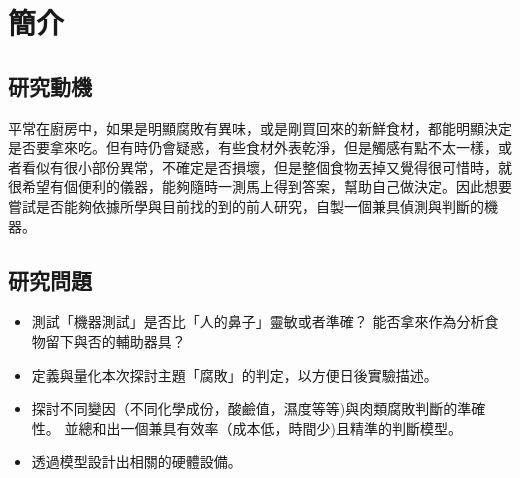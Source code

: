 \chapter{簡介}

\section{研究動機}
平常在廚房中，如果是明顯腐敗有異味，或是剛買回來的新鮮食材，都能明顯決定是否要拿來吃。但有時仍會疑惑，有些食材外表乾淨，但是觸感有點不太一樣，或者看似有很小部份異常，不確定是否損壞，但是整個食物丟掉又覺得很可惜時，就很希望有個便利的儀器，能夠隨時一測馬上得到答案，幫助自己做決定。因此想要嘗試是否能夠依據所學與目前找的到的前人研究，自製一個兼具偵測與判斷的機器。

\section{研究問題}
\begin{itemize}
	\item 測試「機器測試」是否比「人的鼻子」靈敏或者準確？
		能否拿來作為分析食物留下與否的輔助器具？
	\item 定義與量化本次探討主題「腐敗」的判定，以方便日後實驗描述。
	\item 探討不同變因（不同化學成份，酸鹼值，濕度等等)與肉類腐敗判斷的準確性。
		並總和出一個兼具有效率（成本低，時間少)且精準的判斷模型。
	\item 透過模型設計出相關的硬體設備。
\end{itemize}